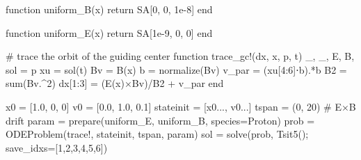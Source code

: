 \documentclass[
  a4paper,
  DIV=11]{scrreprt}
\newenvironment{Shaded}{\begin{snugshade}}{\end{snugshade}}
\newcommand{\CommentTok}[1]{\textcolor[rgb]{0.37,0.37,0.37}{#1}}
\newcommand{\ControlFlowTok}[1]{\textcolor[rgb]{0.00,0.23,0.31}{#1}}
\newcommand{\FloatTok}[1]{\textcolor[rgb]{0.68,0.00,0.00}{#1}}
\newcommand{\FunctionTok}[1]{\textcolor[rgb]{0.28,0.35,0.67}{#1}}
\newcommand{\KeywordTok}[1]{\textcolor[rgb]{0.00,0.23,0.31}{#1}}
\newcommand{\NormalTok}[1]{\textcolor[rgb]{0.00,0.23,0.31}{#1}}
\newcommand{\OperatorTok}[1]{\textcolor[rgb]{0.37,0.37,0.37}{#1}}
\begin{document}
\begin{Shaded}
\begin{Highlighting}[]
\KeywordTok{function} \FunctionTok{uniform\_B}\NormalTok{(x)}
    \ControlFlowTok{return}\NormalTok{ SA[}\FloatTok{0}\NormalTok{, }\FloatTok{0}\NormalTok{, }\FloatTok{1e{-}8}\NormalTok{]}
\KeywordTok{end}

\KeywordTok{function} \FunctionTok{uniform\_E}\NormalTok{(x)}
    \ControlFlowTok{return}\NormalTok{ SA[}\FloatTok{1e{-}9}\NormalTok{, }\FloatTok{0}\NormalTok{, }\FloatTok{0}\NormalTok{]}
\KeywordTok{end}

\CommentTok{\# trace the orbit of the guiding center}
\KeywordTok{function} \FunctionTok{trace\_gc!}\NormalTok{(dx, x, p, t)}
\NormalTok{    \_, \_, E, B, sol }\OperatorTok{=}\NormalTok{ p}
\NormalTok{    xu }\OperatorTok{=} \FunctionTok{sol}\NormalTok{(t)}
\NormalTok{    Bv }\OperatorTok{=} \FunctionTok{B}\NormalTok{(x)}
\NormalTok{    b }\OperatorTok{=} \FunctionTok{normalize}\NormalTok{(Bv)}
\NormalTok{    v\_par }\OperatorTok{=}\NormalTok{ (xu[}\FloatTok{4}\OperatorTok{:}\FloatTok{6}\NormalTok{]}\OperatorTok{⋅}\NormalTok{b)}\OperatorTok{.*}\NormalTok{b}
\NormalTok{    B2 }\OperatorTok{=} \FunctionTok{sum}\NormalTok{(Bv}\OperatorTok{.\^{}}\FloatTok{2}\NormalTok{)}
\NormalTok{    dx[}\FloatTok{1}\OperatorTok{:}\FloatTok{3}\NormalTok{] }\OperatorTok{=}\NormalTok{ (}\FunctionTok{E}\NormalTok{(x)}\OperatorTok{×}\NormalTok{Bv)}\OperatorTok{/}\NormalTok{B2 }\OperatorTok{+}\NormalTok{ v\_par}
\KeywordTok{end}

\NormalTok{x0 }\OperatorTok{=}\NormalTok{ [}\FloatTok{1.0}\NormalTok{, }\FloatTok{0}\NormalTok{, }\FloatTok{0}\NormalTok{]}
\NormalTok{v0 }\OperatorTok{=}\NormalTok{ [}\FloatTok{0.0}\NormalTok{, }\FloatTok{1.0}\NormalTok{, }\FloatTok{0.1}\NormalTok{]}
\NormalTok{stateinit }\OperatorTok{=}\NormalTok{ [x0}\OperatorTok{...}\NormalTok{, v0}\OperatorTok{...}\NormalTok{]}
\NormalTok{tspan }\OperatorTok{=}\NormalTok{ (}\FloatTok{0}\NormalTok{, }\FloatTok{20}\NormalTok{)}
\CommentTok{\# E×B drift}
\NormalTok{param }\OperatorTok{=} \FunctionTok{prepare}\NormalTok{(uniform\_E, uniform\_B, species}\OperatorTok{=}\NormalTok{Proton)}
\NormalTok{prob }\OperatorTok{=} \FunctionTok{ODEProblem}\NormalTok{(trace!, stateinit, tspan, param)}
\NormalTok{sol }\OperatorTok{=} \FunctionTok{solve}\NormalTok{(prob, }\FunctionTok{Tsit5}\NormalTok{(); save\_idxs}\OperatorTok{=}\NormalTok{[}\FloatTok{1}\NormalTok{,}\FloatTok{2}\NormalTok{,}\FloatTok{3}\NormalTok{,}\FloatTok{4}\NormalTok{,}\FloatTok{5}\NormalTok{,}\FloatTok{6}\NormalTok{])}


\end{Highlighting}
\end{Shaded}
\end{document}
